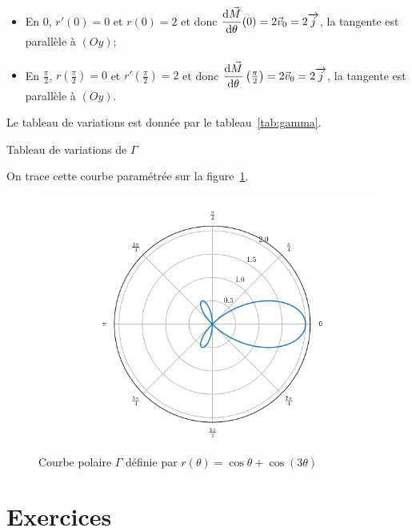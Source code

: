 \begin{itemize}
  \item En \(0\), \(r'(0)=0\) et \(r(0)=2\) et donc
    \(\dfrac{\mathrm{d} \vec{M}}{\mathrm{d} \theta}(0)=2 \vec{v}_0 = 2 \overrightarrow{j}\), la tangente est
    parallèle à \((Oy)\);
  \item En \(\frac{\pi}{2}\), \(r\left(\frac{\pi}{2}\right)=0\) et
    \(r'\left(\frac{\pi}{2}\right)=2\) et donc
    \(\dfrac{\mathrm{d} \vec{M}}{\mathrm{d} \theta}\left(\frac{\pi}{2}\right)=2 \vec{v}_0 = 2
    \overrightarrow{j}\), la tangente est parallèle à \((Oy)\).
\end{itemize}

Le tableau de variations est donnée par le tableau~\ref{tab:gamma}.

\begin{table}
  \centering
  \caption{Tableau de variations de \(\Gamma\)}
  \label{tab:gamma}
\end{table}

On trace cette courbe paramétrée sur la figure~\ref{fig:pol}.
\begin{figure}
  \centering
  \includegraphics[scale = 1]{courbepolaire.png}
  \caption{Courbe polaire \(\Gamma\) définie par \(r(\theta)=\cos\theta +
  \cos(3\theta)\)}
  \label{fig:pol}
\end{figure}
\clearpage
\section{Exercices}

